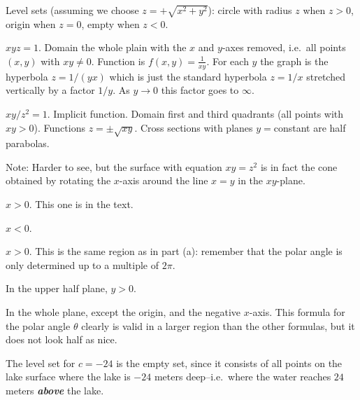 Level sets (assuming we choose $z=+\sqrt{x^2+y^2}$):  circle with radius
$z$ when $z>0$, origin when $z=0$, empty when $z<0$.
\bigskip

\item[{\bfseries(III5.7f)}]

$xyz=1$.
Domain the whole plain with the $x$ and $y$-axes removed, i.e.\ all
points $(x, y)$ with $xy\ne0$.
Function is $f(x, y) = \frac{1} {xy}$.
For each $y$ the graph is the hyperbola $z=1/(yx)$ which is just the
standard hyperbola $z=1/x$ stretched vertically by a factor $1/y$.
As $y\to 0$ this factor goes to $\infty$.
\bigskip

\item[{\bfseries(III5.7g)}]

$xy/z^2=1$.
Implicit function.
Domain first and third quadrants (all points with $xy>0$).
Functions $z= \pm \sqrt{xy}$.
Cross sections with planes $y=$constant are half parabolas.

Note: Harder to see, but the surface with equation $xy=z^2$ is in fact
the cone obtained by rotating the $x$-axis around the line
$x=y$ in the $xy$-plane.
\bigskip

\item[{\bfseries(III5.8a)}]

$x>0$.  This one is in the text.
\bigskip

\item[{\bfseries(III5.8b)}]

$x<0$.
\bigskip

\item[{\bfseries(III5.8c)}]

$x>0$.  This is the same region as in part (a):  remember that the polar angle is
only determined up to a multiple of $2\pi$.
\bigskip

\item[{\bfseries(III5.8d)}]

In the upper half plane, $y>0$.
\bigskip

\item[{\bfseries(III5.8e)}]

In the whole plane, except the origin, and the negative $x$-axis.  This formula for
the polar angle $\theta$ clearly is valid in a larger region than the other formulas,
but it does not look half as nice.
\bigskip

\item[{\bfseries(III5.9)}]

The level set for $c=-24$ is the empty set, since it consists of all points on
the lake surface where the lake is $-24$ meters deep--i.e.~where the water
reaches $24$meters {\bfseries\itshape above} the lake.

